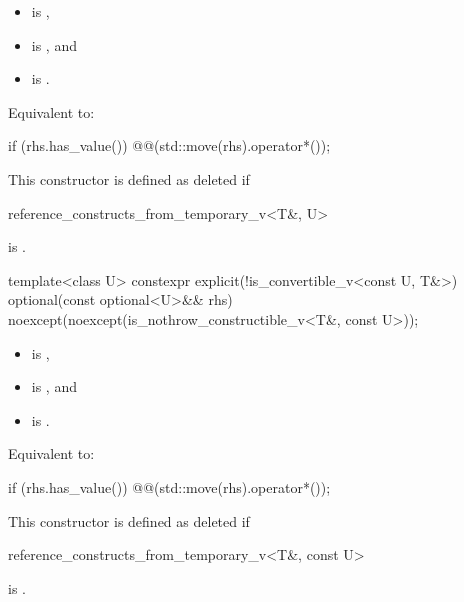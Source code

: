 \begin{itemdescr}
\pnum
\constraints
\begin{itemize}
\item {} is ,
\item {} is , and
\item {} is .
\end{itemize}

\pnum
\effects
Equivalent to:
\begin{codeblock}
if (rhs.has_value()) @@(std::move(rhs).operator*());
\end{codeblock}

\pnum
\remarks
This constructor is defined as deleted if
\begin{codeblock}
reference_constructs_from_temporary_v<T&, U>
\end{codeblock}
is .
\end{itemdescr}

%
\begin{itemdecl}
template<class U>
  constexpr explicit(!is_convertible_v<const U, T&>)
      optional(const optional<U>&& rhs) noexcept(noexcept(is_nothrow_constructible_v<T&, const U>));
\end{itemdecl}

\begin{itemdescr}
\pnum
\constraints
\begin{itemize}
\item {} is ,
\item {} is , and
\item {} is .
\end{itemize}

\pnum
\effects
Equivalent to:
\begin{codeblock}
if (rhs.has_value()) @@(std::move(rhs).operator*());
\end{codeblock}

\pnum
\remarks
This constructor is defined as deleted if
\begin{codeblock}
reference_constructs_from_temporary_v<T&, const U>
\end{codeblock}
is .
\end{itemdescr}


